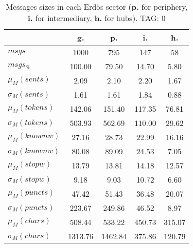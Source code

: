 \begin{table}[h!]
\begin{center}
\begin{tabular}{| l | c | c | c | c |}\hline
 & g. & p. & i. & h. \\\hline
$msgs$ & 1000  & 795  & 147  & 58 \\\hline
$msgs_{\%}$ & 100.00  & 79.50  & 14.70  & 5.80 \\\hline
$\mu_M(sents)$ & 2.09  & 2.10  & 2.20  & 1.67 \\\hline
$\sigma_M(sents)$ & 1.61  & 1.61  & 1.84  & 0.88 \\\hline
$\mu_M(tokens)$ & 142.06  & 151.40  & 117.35  & 76.81 \\\hline
$\sigma_M(tokens)$ & 503.93  & 562.69  & 110.00  & 29.62 \\\hline
$\mu_M(knownw)$ & 27.16  & 28.73  & 22.99  & 16.16 \\\hline
$\sigma_M(knownw)$ & 80.08  & 89.09  & 24.53  & 7.05 \\\hline
$\mu_M(stopw)$ & 13.79  & 13.81  & 14.18  & 12.57 \\\hline
$\sigma_M(stopw)$ & 9.18  & 9.03  & 10.72  & 6.60 \\\hline
$\mu_M(puncts)$ & 47.42  & 51.43  & 36.48  & 20.07 \\\hline
$\sigma_M(puncts)$ & 223.67  & 249.86  & 46.52  & 8.97 \\\hline
$\mu_M(chars)$ & 508.44  & 533.22  & 450.73  & 315.07 \\\hline
$\sigma_M(chars)$ & 1313.76  & 1462.84  & 375.86  & 120.79 \\\hline
\end{tabular}
\caption{Messages sizes in each Erd\"os sector ({{\bf p.}} for periphery, {{\bf i.}} for intermediary, {{\bf h.}} for hubs). TAG: 0}
\end{center}
\end{table}